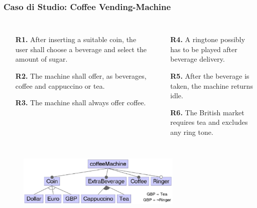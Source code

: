 \documentclass{beamer}
\newcommand{\highlightorange}[1]{{\color{codeorange}#1}}
\newcommand{\highlightgreen}[1]{{\color{codegreen}#1}}
\begin{document}
\begin{frame}
\frametitle{Caso di Studio: Coffee Vending-Machine}

\begin{columns}
\begin{itemize}
\item[\textbf{R1.}] After inserting a \highlightgreen{suitable} coin, the user shall choose a beverage and select the amount of sugar.
\item[\textbf{R2.}] The machine shall offer, as beverages, coffee \highlightorange{and} cappuccino \highlightgreen{or} tea.
\item[\textbf{R3.}] The machine shall \highlightorange{always} offer coffee.
\end{itemize}
\begin{itemize}
\item[\textbf{R4.}] A ringtone \highlightgreen{possibly} has to \highlightorange{be played} after beverage delivery.
\item[\textbf{R5.}] After the beverage \highlightorange{is taken}, the machine returns idle.
\item[\textbf{R6.}] The British market requires tea and excludes \highlightorange{any} ring tone.
\end{itemize}
\end{columns}

\begin{figure}
\includegraphics[width=0.7\textwidth]{coffee2.png}
\end{figure}
\end{frame}


\end{document}
